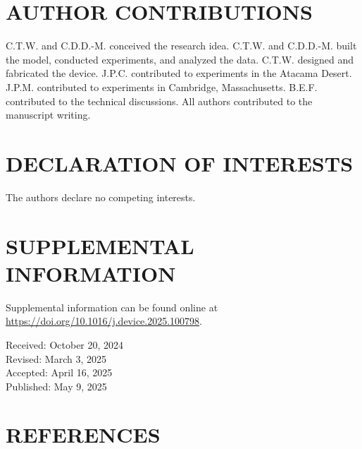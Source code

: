 \documentclass[11pt]{article}
\begin{document}
\section{AUTHOR CONTRIBUTIONS}

C.T.W. and C.D.D.-M. conceived the research idea. C.T.W. and C.D.D.-M. built the model, conducted experiments, and analyzed the data. C.T.W. designed and fabricated the device. J.P.C. contributed to experiments in the Atacama Desert. J.P.M. contributed to experiments in Cambridge, Massachusetts. B.E.F. contributed to the technical discussions. All authors contributed to the manuscript writing.

\section{DECLARATION OF INTERESTS}

The authors declare no competing interests.

\section{SUPPLEMENTAL INFORMATION}

Supplemental information can be found online at \url{https://doi.org/10.1016/j.device.2025.100798}.

\begin{flushleft}
Received: October 20, 2024\\
Revised: March 3, 2025\\
Accepted: April 16, 2025\\
Published: May 9, 2025
\end{flushleft}

\section{REFERENCES}
\end{document}

